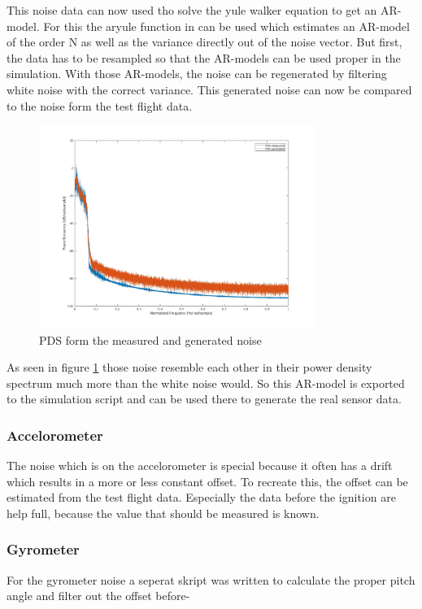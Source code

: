 This noise data can now used tho solve the yule walker equation to get an AR-model.
For this the aryule function in can be used which estimates an AR-model of the order N as well as the variance directly out of the noise vector.
But first, the data has to be resampled so that the AR-models can be used proper in the simulation.
With those AR-models, the noise can be regenerated by filtering white noise with the correct variance.
This generated noise can now be compared to the noise form the test flight data.

\begin{figure}[h!]
 \centering
 \includegraphics[width=0.8\textwidth]{./Pictures/PDSnoise.jpg}
 \caption{PDS form the measured and generated noise}
 \label{fig:PDSNoise}
\end{figure}


As seen in figure \ref{fig:PDSNoise} those noise resemble each other in their power density spectrum much more than the white noise would.
So this AR-model is exported to the simulation script and can be used there to generate the real sensor data.

\subsubsection{Accelorometer}
The noise which is on the accelorometer is special because it often has a drift which results in a more or less constant offset.
To recreate this, the offset can be estimated from the test flight data.
Especially the data before the ignition are help full, because the value that should be measured is known.

\subsubsection{Gyrometer}
For the gyrometer noise a seperat skript was written to calculate the proper pitch angle and filter out the offset before-


